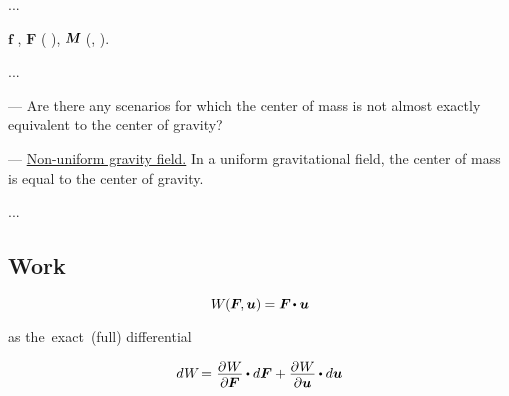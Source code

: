 ...

\noindent
{}
$\bm{f}$\ru{\:---}  ,
$\bm{F}$\ru{\:---}  (   ),
$\mathboldM$\ru{\:---}  (, ).

...

--- Are there any scenarios for which the center of mass is not almost exactly equivalent to the center of gravity?

--- \href{http://en.wikipedia.org/wiki/Centers_of_gravity_in_non-uniform_fields}{Non-uniform gravity field.} In a uniform gravitational field, the center of mass is equal to the center of gravity.

...

\subsection*{Work}

\begin{equation*}
W \hspace{-0.12ex} ( \hspace{-0.08ex} \bm{F} \hspace{-0.25ex}, \bm{u} ) \hspace{-0.1ex} = \bm{F} \hspace{-0.2ex} \dotp \bm{u}
\end{equation*}

as the~exact~(full) differential

\nopagebreak\[
d \hspace{.1ex} W \hspace{-0.33ex}  = \hspace{.08ex} \displaystyle \frac{\raisemath{-0.2em}{\partial \hspace{.1ex} W}}{\partial \hspace{-0.1ex} \bm{F}} \hspace{-0.1ex} \dotp d \bm{F} + \frac{\raisemath{-0.2em}{\partial \hspace{.1ex} W}}{\partial \bm{u}} \hspace{-0.1ex} \dotp d \bm{u}
\]

